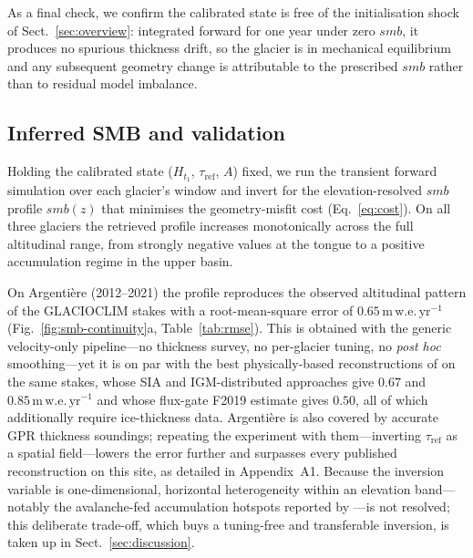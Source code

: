 As a final check, we confirm the calibrated state is free of the initialisation
shock of Sect.~\ref{sec:overview}: integrated forward for one year under zero $smb$,
it produces no spurious thickness drift, so the glacier is in mechanical equilibrium
and any subsequent geometry change is attributable to the prescribed $smb$ rather
than to residual model imbalance.

\subsection{Inferred SMB and validation}\label{sec:inferred}

Holding the calibrated state ($H_{t_1}$, $\tau_{\mathrm{ref}}$, $A$) fixed, we run the
transient forward simulation over each glacier's window and invert for the
elevation-resolved $smb$ profile $smb(z)$ that minimises the geometry-misfit cost
(Eq.~\ref{eq:cost}). On all three glaciers the retrieved profile increases
monotonically across the full altitudinal range, from strongly negative values at
the tongue to a positive accumulation regime in the upper basin.

On Argentière (2012--2021) the profile reproduces the observed altitudinal pattern
of the GLACIOCLIM stakes with a root-mean-square error of
$0.65\,\mathrm{m\,w.e.\,yr^{-1}}$ (Fig.~\ref{fig:smb-continuity}a,
Table~\ref{tab:rmse}). This is obtained with the generic velocity-only
pipeline---no thickness survey, no per-glacier tuning, no \emph{post hoc}
smoothing---yet it is on par with the best physically-based reconstructions of
\citet{kneib2024} on the same stakes, whose SIA and IGM-distributed approaches give
$0.67$ and $0.85\,\mathrm{m\,w.e.\,yr^{-1}}$ and whose flux-gate F2019 estimate
gives $0.50$, all of which additionally require ice-thickness
data. Argentière is also covered by accurate GPR thickness soundings; repeating the
experiment with them---inverting $\tau_{\mathrm{ref}}$ as a spatial field---lowers
the error further and surpasses every published reconstruction on this site, as
detailed in Appendix~A1. Because the inversion variable is one-dimensional,
horizontal heterogeneity within an elevation band---notably the avalanche-fed
accumulation hotspots reported by \citet{kneib2024}---is not resolved; this
deliberate trade-off, which buys a tuning-free and transferable inversion, is taken
up in Sect.~\ref{sec:discussion}.

